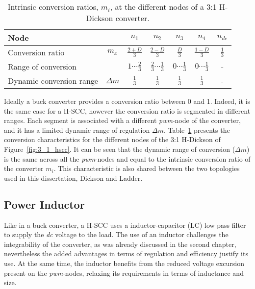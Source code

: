 \begin{table}[h]

\centering
\caption{Intrinsic conversion ratios, $m_i$, at the different nodes of a 3:1 H-Dickson converter.}
\label{tab:3:1 H-Dick_M}
\renewcommand{\arraystretch}{1.5}%
\begin{tabular}{l  c | c c c c c }
 Node &  & $n_1$ & $n_2$ & $n_3$ & $n_4$ & $n_{dc}$ \\
 \midrule
 Conversion ratio & $m_x$ & $\frac{2+D}{3} $    & $\frac{2-D}{3} $ & $\frac{D}{3} $ & $\frac{1-D}{3} $ & $\frac{1}{3}$ \\
 Range of conversion &       & $1 \cdots \frac{2}{3}$ & $\frac{2}{3} \cdots \frac{1}{3} $ & $0 \cdots \frac{1}{3}$ & $0 \cdots  \frac{1}{3} $ & - \\
 Dynamic conversion range & $\Delta m$ &  $\frac{1}{3}$ &  $\frac{1}{3}$ &  $\frac{1}{3}$ &  $\frac{1}{3}$ &  -
\end{tabular}
\end{table}

Ideally a buck converter provides a conversion ratio between 0 and 1. Indeed, it is the same case for a H-SCC, however the conversion ratio is segmented in different ranges. Each segment is associated with a different \emph{pwm}-node of the converter, and it has a limited dynamic range of regulation $\Delta m$. Table~\ref{tab:3:1 H-Dick_M} presents the conversion characteristics for the different nodes of the 3:1 H-Dickson of Figure~\ref{fig:3_1_hscc}. It can be seen that the dynamic range of conversion ($\Delta m$) is the same across all the \emph{pwm}-nodes and equal to the intrinsic conversion ratio of the converter $m_i$. This characteristic is also shared between the two topologies used in this dissertation, Dickson and Ladder.

\subsection{Power Inductor}
\label{ch:power_inductor}

Like in a buck converter, a H-SCC uses a inductor-capacitor (LC) low pass filter to supply the \emph{dc} voltage to the load. The use of an inductor challenges the integrability of the converter, as was already discussed in the second chapter, nevertheless the added advantages in terms of regulation and efficiency justify its use. At the same time, the inductor benefits from the reduced voltage excursion present on the \emph{pwm}-nodes, relaxing its requirements in terms of inductance and size.

